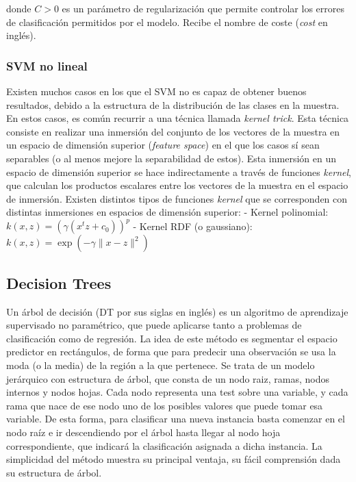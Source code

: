 \documentclass[12pt,a4paper,]{book}
\numberwithin{dummy}{section}
\theoremstyle{ocrenumbox}
\theoremstyle{blacknumex}
\theoremstyle{blacknumbox}
\theoremstyle{ocrenum}
\theoremstyle{ocrenum}
\begin{document}
donde \(C>0\) es un parámetro de regularización que permite controlar
los errores de clasificación permitidos por el modelo. Recibe el nombre
de coste (\emph{cost} en inglés).

\hypertarget{svm-no-lineal}{%
\subsubsection{SVM no lineal}\label{svm-no-lineal}}

Existen muchos casos en los que el SVM no es capaz de obtener buenos
resultados, debido a la estructura de la distribución de las clases en
la muestra. En estos casos, es común recurrir a una técnica llamada
\emph{kernel trick}. Esta técnica consiste en realizar una inmersión del
conjunto de los vectores de la muestra en un espacio de dimensión
superior (\emph{feature space}) en el que los casos sí sean separables
(o al menos mejore la separabilidad de estos). Esta inmersión en un
espacio de dimensión superior se hace indirectamente a través de
funciones \emph{kernel}, que calculan los productos escalares entre los
vectores de la muestra en el espacio de inmersión. Existen distintos
tipos de funciones \emph{kernel} que se corresponden con distintas
inmersiones en espacios de dimensión superior: - Kernel polinomial:
\(k(x,z) = \left( \gamma(x^tz + c_0) \right)^p\) - Kernel RDF (o
gaussiano): \(k(x,z) = \exp(-\gamma \| x-z\|^2)\)

\hypertarget{decision-trees}{%
\subsection{Decision Trees}\label{decision-trees}}

Un árbol de decisión (DT por sus siglas en inglés) es un algoritmo de
aprendizaje supervisado no paramétrico, que puede aplicarse tanto a
problemas de clasificación como de regresión. La idea de este método es
segmentar el espacio predictor en rectángulos, de forma que para
predecir una observación se usa la moda (o la media) de la región a la
que pertenece. Se trata de un modelo jerárquico con estructura de árbol,
que consta de un nodo raiz, ramas, nodos internos y nodos hojas. Cada
nodo representa una test sobre una variable, y cada rama que nace de ese
nodo uno de los posibles valores que puede tomar esa variable. De esta
forma, para clasificar una nueva instancia basta comenzar en el nodo
raíz e ir descendiendo por el árbol hasta llegar al nodo hoja
correspondiente, que indicará la clasificación asignada a dicha
instancia. La simplicidad del método muestra su principal ventaja, su
fácil comprensión dada su estructura de árbol.
\end{document}
